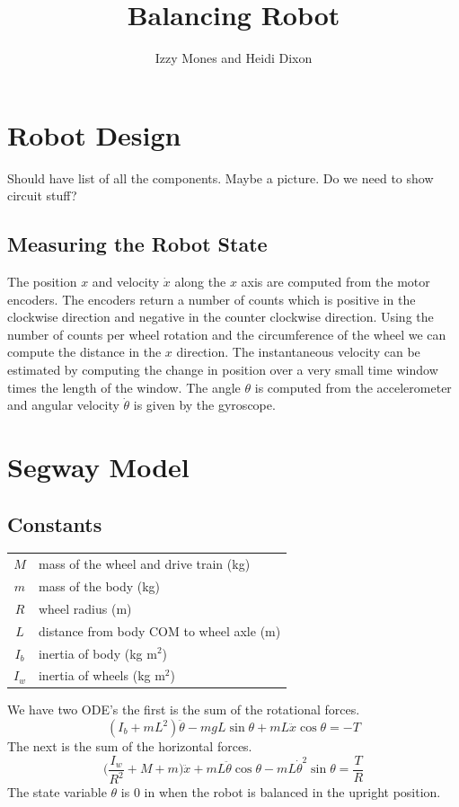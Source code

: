 \documentclass[]{article}
\title{Balancing Robot}
\author{Izzy Mones and Heidi Dixon}
\begin{document}
	\maketitle


 
\section*{Robot Design}
Should have list of all the components. Maybe a picture. Do we need to show circuit stuff?

\subsection*{Measuring the Robot State}
The position $x$ and velocity $\dot{x}$ along the $x$ axis are computed from the motor encoders. The encoders return a number of counts which is positive in the clockwise direction and negative in the counter clockwise direction. Using the number of counts per wheel rotation and the circumference of the wheel we can compute the distance in the $x$ direction. The instantaneous velocity can be estimated by computing the change in position over a very small time window times the length of the window. The angle $\theta$ is computed from the accelerometer and angular velocity $\dot{\theta}$ is given by the gyroscope.

\section*{Segway Model}

\subsection*{Constants}
\begin{center}
\begin{tabular}{ cl } 
 $M$  & mass of the  wheel and drive train (kg) \\ 
 $m$ & mass of the body (kg) \\ 
 $R$ & wheel radius (m) \\ 
 $L$ & distance from body COM to wheel axle (m) \\ 
 $I_b$ & inertia of body (kg m$^2$)  \\ 
$I_w$ & inertia of wheels (kg m$^2$)
\end{tabular}
\end{center}

We have two ODE's the first is the sum of the rotational forces. 
\begin{equation*}
(I_b + mL^2) \ddot{\theta} - mgL \sin \theta + mL \ddot{x} \cos \theta = - T 
\end{equation*}
The next is the sum of the horizontal forces.
\begin{equation*}
\Big(\frac{I_w}{R^2} + M + m \Big) \ddot{x} + mL \ddot{\theta} \cos \theta - mL \dot{\theta}^2 \sin \theta = \frac{T}{R}
\end{equation*}
The state variable $\theta$ is $0$ in when the robot is balanced in the upright position.
\end{document}
